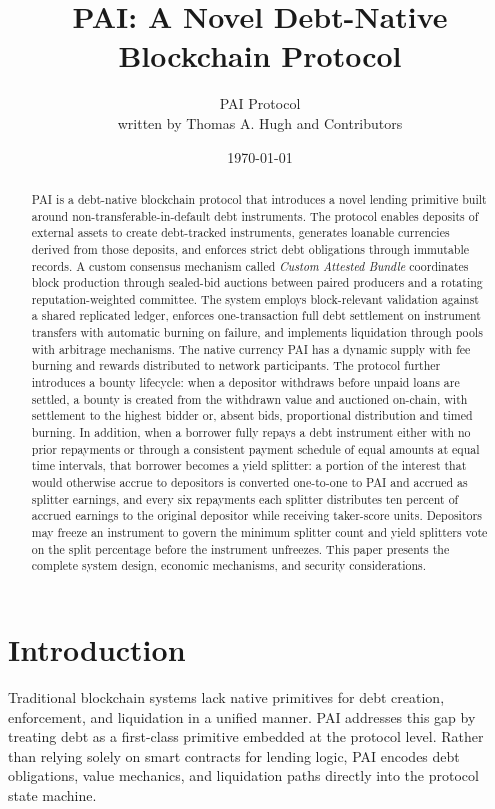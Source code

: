 \documentclass[11pt,a4paper]{article}
\title{PAI: A Novel Debt-Native Blockchain Protocol}
\author{PAI Protocol \\ written by Thomas A. Hugh and Contributors}
\date{\today}
\begin{document}
\maketitle

\begin{abstract}
PAI is a debt-native blockchain protocol that introduces a novel lending primitive built around non-transferable-in-default debt instruments. The protocol enables deposits of external assets to create debt-tracked instruments, generates loanable currencies derived from those deposits, and enforces strict debt obligations through immutable records. A custom consensus mechanism called \textit{Custom Attested Bundle} coordinates block production through sealed-bid auctions between paired producers and a rotating reputation-weighted committee. The system employs block-relevant validation against a shared replicated ledger, enforces one-transaction full debt settlement on instrument transfers with automatic burning on failure, and implements liquidation through pools with arbitrage mechanisms. The native currency PAI has a dynamic supply with fee burning and rewards distributed to network participants. The protocol further introduces a bounty lifecycle: when a depositor withdraws before unpaid loans are settled, a bounty is created from the withdrawn value and auctioned on-chain, with settlement to the highest bidder or, absent bids, proportional distribution and timed burning. In addition, when a borrower fully repays a debt instrument either with no prior repayments or through a consistent payment schedule of equal amounts at equal time intervals, that borrower becomes a yield splitter: a portion of the interest that would otherwise accrue to depositors is converted one-to-one to PAI and accrued as splitter earnings, and every six repayments each splitter distributes ten percent of accrued earnings to the original depositor while receiving taker-score units. Depositors may freeze an instrument to govern the minimum splitter count and yield splitters vote on the split percentage before the instrument unfreezes. This paper presents the complete system design, economic mechanisms, and security considerations.
\end{abstract}

\tableofcontents
\newpage

\section{Introduction}
Traditional blockchain systems lack native primitives for debt creation, enforcement, and liquidation in a unified manner. PAI addresses this gap by treating debt as a first-class primitive embedded at the protocol level. Rather than relying solely on smart contracts for lending logic, PAI encodes debt obligations, value mechanics, and liquidation paths directly into the protocol state machine.
\end{document}
